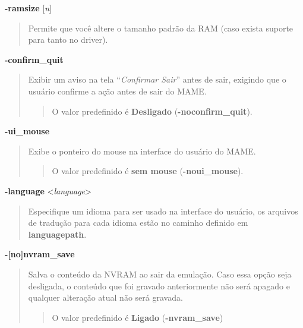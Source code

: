 \documentclass[letterpaper,10pt,brazil]{sphinxmanual}
\begin{document}
\label{commandline/commandline-all:mame-commandline-ramsize}
\textbf{-ramsize} {[}\emph{n}{]}
\begin{quote}

Permite que você altere o tamanho padrão da RAM (caso exista suporte
para tanto no driver).
\end{quote}
\label{commandline/commandline-all:mame-commandline-confirmquit}
\textbf{-confirm\_quit}
\begin{quote}

Exibir um aviso na tela ``\emph{Confirmar Sair}'' antes de sair, exigindo
que o usuário confirme a ação antes de sair do MAME.
\begin{quote}

O valor predefinido é \textbf{Desligado} (\textbf{-noconfirm\_quit}).
\end{quote}
\end{quote}
\label{commandline/commandline-all:mame-commandline-uimouse}
\textbf{-ui\_mouse}
\begin{quote}

Exibe o ponteiro do mouse na interface do usuário do MAME.
\begin{quote}

O valor predefinido é \textbf{sem mouse} (\textbf{-noui\_mouse}).
\end{quote}
\end{quote}
\label{commandline/commandline-all:mame-commandline-language}
\textbf{-language} \textless{}\emph{language}\textgreater{}
\begin{quote}

Especifique um idioma para ser usado na interface do usuário, os
arquivos de tradução para cada idioma estão no caminho definido em
\textbf{languagepath}.
\end{quote}
\label{commandline/commandline-all:mame-commandline-nvramsave}
\textbf{-{[}no{]}nvram\_save}
\begin{quote}

Salva o conteúdo da NVRAM ao sair da emulação. Caso essa opção seja
desligada, o conteúdo que foi gravado anteriormente não será apagado
e qualquer alteração atual não será gravada.
\begin{quote}

O valor predefinido é \textbf{Ligado} (\textbf{-nvram\_save})
\end{quote}
\end{quote}
\label{commandline/commandline-all:mame-commandline-autobootcommand}
\end{document}
